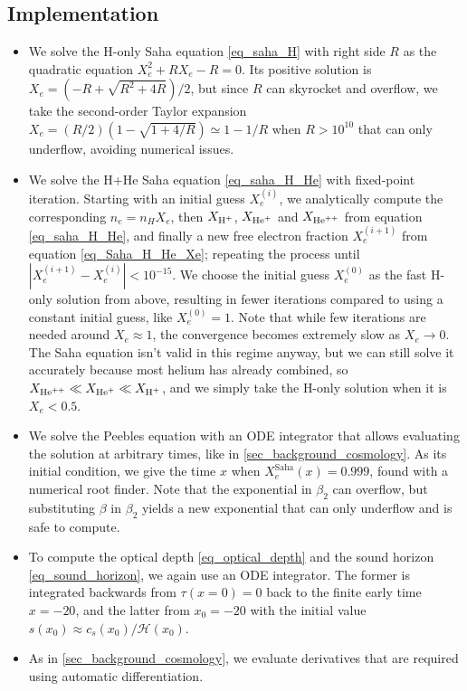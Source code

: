 \documentclass[10pt,a4paper]{article}
\begin{document}
\subsection{Implementation}

\begin{itemize}
\item
We solve the H-only Saha equation \eqref{eq_saha_H}
with right side $R$
as the quadratic equation $X_e^2 + R X_e - R = 0$.
Its positive solution is $X_e = (-R + \sqrt{R^2+4R})/2$,
but since $R$ can skyrocket and overflow,
we take the second-order Taylor expansion $X_e = (R/2) (1 - \sqrt{1 + 4/R}) \simeq 1 - 1/R$
when $R > 10^{10}$ that can only underflow, avoiding numerical issues.

\item
We solve the H+He Saha equation \eqref{eq_saha_H_He} with fixed-point iteration.
Starting with an initial guess $X_e^{(i)}$,
we analytically compute the corresponding $n_e = n_H X_e$,
then $X_{\text{H}^+}$, $X_{\text{He}^+}$ and $X_{\text{He}^{++}}$ from equation \eqref{eq_saha_H_He},
and finally a new free electron fraction $X_e^{(i+1)}$ from equation \eqref{eq_Saha_H_He_Xe};
repeating the process until $|X_e^{(i+1)}-X_e^{(i)}| < 10^{-15}$.
We choose the initial guess $X_e^{(0)}$ as the fast H-only solution from above,
resulting in fewer iterations compared to using a constant initial guess, like $X_e^{(0)} = 1$.
Note that while few iterations are needed around $X_e \approx 1$,
the convergence becomes extremely slow as $X_e \rightarrow 0$.
The Saha equation isn't valid in this regime anyway,
but we can still solve it accurately because most helium has already combined,
so $X_{\text{He}^{++}} \ll X_{\text{He}^+} \ll X_{\text{H}^+}$, and we simply take the H-only solution when it is $X_e < 0.5$.

\item
We solve the Peebles equation with an ODE integrator that allows evaluating the solution at arbitrary times,
like in \cref{sec_background_cosmology}.
As its initial condition, we give the time $x$ when $X_e^\text{Saha}(x) = 0.999$, found with a numerical root finder.
Note that the exponential in $\beta_2$ can overflow,
but substituting $\beta$ in $\beta_2$ yields a new exponential that can only underflow and is safe to compute.

\item
To compute the optical depth \eqref{eq_optical_depth} and the sound horizon \eqref{eq_sound_horizon},
we again use an ODE integrator.
The former is integrated backwards from $\tau(x=0)=0$ back to the finite early time $x=-20$,
and the latter from $x_0 = -20$ with the initial value $s(x_0) \approx c_s(x_0) / \mathcal{H}(x_0)$.

\item
As in \cref{sec_background_cosmology},
we evaluate derivatives that are required using automatic differentiation.
\end{itemize}
\end{document}
